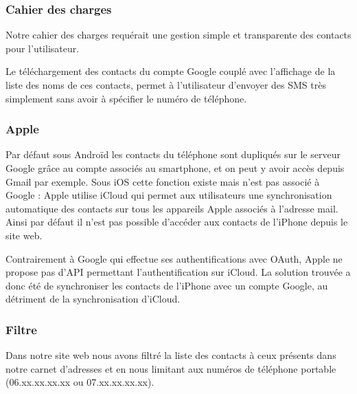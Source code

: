 
\subsubsection{Cahier des charges}

Notre cahier des charges requérait une gestion simple et transparente des contacts pour l'utilisateur.

Le téléchargement des contacts du compte Google couplé avec l'affichage de la liste des noms de ces contacts, permet à l'utilisateur d'envoyer des SMS très simplement sans avoir à spécifier le numéro de téléphone.
\\


\subsubsection{Apple}

Par défaut sous Androïd les contacts du téléphone sont dupliqués sur le serveur Google grâce au compte associés au smartphone, et on peut y avoir accès depuis Gmail par exemple.
Sous iOS cette fonction existe mais n'est pas associé à Google : Apple utilise iCloud qui permet aux utilisateurs une synchronisation automatique des contacts sur tous les appareils Apple associés à l'adresse mail.
Ainsi par défaut il n'est pas possible d'accéder aux contacts de l'iPhone depuis le site web.

Contrairement à Google qui effectue ses authentifications avec OAuth, Apple ne propose pas d'API permettant l'authentification sur iCloud.
La solution trouvée a donc été de synchroniser les contacts de l'iPhone avec un compte Google, au détriment de la synchronisation d'iCloud.
\\


\subsubsection{Filtre}

Dans notre site web nous avons filtré la liste des contacts à ceux présents dans notre carnet d'adresses et en nous limitant aux numéros de téléphone portable (06.xx.xx.xx.xx ou 07.xx.xx.xx.xx).

